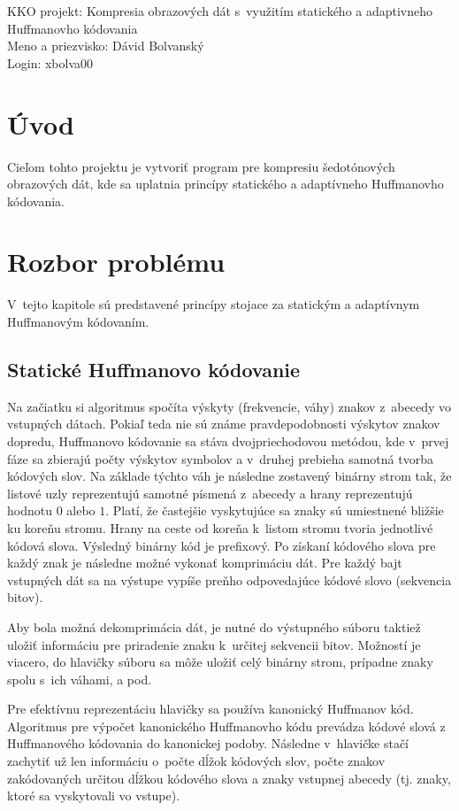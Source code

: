 \documentclass[10pt,a4paper]{article}
\begin{document}
\noindent
KKO projekt: Kompresia obrazových dát s~využitím statického a adaptivneho Huffmanovho kódovania\\
Meno a priezvisko: Dávid Bolvanský\\
Login: xbolva00

\section{Úvod}
Cieľom tohto projektu je vytvoriť program pre kompresiu šedotónových obrazových dát, kde sa uplatnia princípy statického a adaptívneho Huffmanovho kódovania.

\section{Rozbor problému}

V~tejto kapitole sú predstavené princípy stojace za statickým a adaptívnym Huffmanovým kódovaním.

\subsection{Statické Huffmanovo kódovanie}

Na začiatku si algoritmus spočíta výskyty (frekvencie, váhy) znakov z~abecedy vo vstupných dátach. Pokiaľ teda nie sú známe pravdepodobnosti výskytov znakov dopredu, Huffmanovo kódovanie sa stáva dvojpriechodovou metódou, kde v~prvej fáze sa zbierajú počty výskytov symbolov a v~druhej prebieha samotná tvorba kódových slov. 
Na základe týchto váh je následne zostavený binárny strom tak, že listové uzly reprezentujú samotné písmená z~abecedy a hrany reprezentujú hodnotu $0$ alebo $1$. Platí, že častejšie vyskytujúce sa znaky sú umiestnené bližšie ku koreňu stromu. Hrany na ceste od koreňa k~listom stromu tvoria jednotlivé kódová slova. Výsledný binárny kód je prefixový. Po získaní kódového slova pre každý znak je následne možné vykonať komprimáciu dát. Pre každý bajt vstupných dát sa na výstupe vypíše preňho odpovedajúce kódové slovo (sekvencia bitov). 

Aby bola možná dekomprimácia dát, je nutné do výstupného súboru taktiež uložiť informáciu pre priradenie znaku k~určitej sekvencii bitov. Možností je viacero, do hlavičky súboru sa môže uložiť celý binárny strom, prípadne znaky spolu s~ich váhami, a pod. 

Pre efektívnu reprezentáciu hlavičky sa používa kanonický Huffmanov kód. Algoritmus pre výpočet kanonického Huffmanovho kódu prevádza kódové slová z~ Huffmanového kódovania do kanonickej podoby. Následne v~hlavičke stačí zachytiť už len informáciu o~počte dĺžok kódových slov, počte znakov zakódovaných určitou dĺžkou kódového slova a znaky vstupnej abecedy (tj. znaky, ktoré sa vyskytovali vo vstupe).
\end{document}
